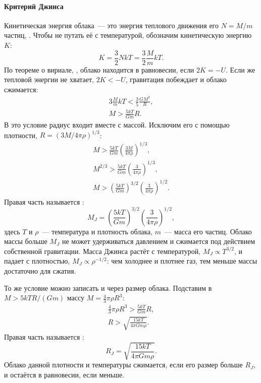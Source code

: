 \paragraph{Критерий Джинса} Кинетическая энергия облака~--- это энергия теплового движения его $N = M / m$ частиц, . Чтобы не путать её с температурой, обозначим кинетическую энергию $K$:
\begin{equation*}
    K = \frac{3}{2} N k T = \frac{3}{2}\frac{M}{m}kT.
\end{equation*}
По теореме о вириале, , облако находится в равновесии, если $2K = -U$. Если же тепловой энергии не хватает, $2K < -U$, гравитация побеждает и облако сжимается:
\begin{gather*}
    3\frac{M}{m}kT < \frac{3}{5}\frac{GM^2}{R},\\
    M > \frac{5kT}{Gm}R.
\end{gather*}
В это условие радиус входит вместе с массой. Исключим его с помощью плотности, $R = \left(3M / 4\pi\rho\right)^{1/3}$:
\begin{gather*}
    M > \frac{5kT}{Gm}\left(\frac{3M}{4\pi\rho}\right)^{1/3},\\
    M^{2/3} > \frac{5kT}{Gm}\left(\frac{3}{4\pi\rho}\right)^{1/3},\\
    M > \left(\frac{5kT}{Gm}\right)^{3/2}\left(\frac{3}{4\pi\rho}\right)^{1/2}.
\end{gather*}
Правая часть называется :
\begin{equation}
    M_J = \left(\frac{5kT}{Gm}\right)^{3/2}\left(\frac{3}{4\pi\rho}\right)^{1/2},
    \label{eq:jeans-mass}
\end{equation}
здесь $T$ и $\rho$~--- температура и плотность облака, $m$~--- масса его частиц. Облако массы больше $M_J$ не может удерживаться давлением и сжимается под действием собственной гравитации. Масса Джинса растёт с температурой, $M_J \propto T^{3/2}$, и падает с плотностью, $M_J \propto \rho^{-1/2}$: чем холоднее и плотнее газ, тем меньше массы достаточно для сжатия.

То же условие можно записать и через размер облака. Подставим в $M > 5kTR / (Gm)$ массу $M = \frac{4}{3}\pi\rho R^3$:
\begin{gather*}
    \frac{4}{3}\pi\rho R^3 > \frac{5kT}{Gm}R,\\
    R > \sqrt{\frac{15 kT}{4\pi G m \rho}}.
\end{gather*}
Правая часть называется :
\begin{equation}
    R_J = \sqrt{\frac{15 kT}{4\pi G m \rho}}.
    \label{eq:jeans-radius}
\end{equation}
Облако данной плотности и температуры сжимается, если его размер больше $R_J$, и остаётся в равновесии, если меньше.

